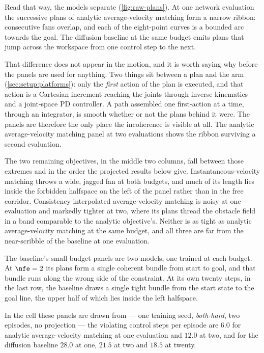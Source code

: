 Read that way, the models separate (\autoref{fig:raw-plans}). At one network evaluation the successive
plans of analytic average-velocity matching form a narrow ribbon: consecutive fans overlap, and each of
the eight-point curves is a bounded arc towards the goal. The diffusion baseline at the same budget emits
plans that jump across the workspace from one control step to the next.

That difference does not appear in the motion, and it is worth saying why before the panels are used for
anything. Two things sit between a plan and the arm (\autoref{sec:setup:platforms}): only the
\emph{first} action of the plan is executed, and that action is a Cartesian increment reaching the joints
through inverse kinematics and a joint-space PD controller. A path assembled one first-action at a time,
through an integrator, is smooth whether or not the plans behind it were. The panels are therefore the
only place the incoherence is visible at all. The analytic average-velocity matching panel at two
evaluations shows the ribbon surviving a second evaluation.

The two remaining objectives, in the middle two columns, fall between those extremes and in the order
the projected results below give. Instantaneous-velocity matching throws a wide, jagged fan at both budgets, and much of its length
lies inside the forbidden halfspace on the left of the panel rather than in the free corridor.
Consistency-interpolated average-velocity matching is noisy at one evaluation and markedly tighter at two,
where its plans thread the obstacle field in a band comparable to the analytic objective's. Neither is as
tight as analytic average-velocity matching at the same budget, and all three are far from the near-scribble
of the baseline at one evaluation.

The baseline's small-budget panels are two models, one trained at each budget. At $\nfe=2$ its plans
form a single coherent bundle from start to goal, and that bundle runs along the wrong side of the
constraint. At its own twenty steps, in the last row, the baseline draws a single tight bundle from the
start state to the goal line, the upper half of which lies inside the left halfspace.

In the cell these panels are drawn from --- one training seed, \emph{both-hard}, two episodes, no
projection --- the violating control steps per episode are $6.0$ for analytic average-velocity matching at one evaluation and $12.0$ at two, and for the
diffusion baseline $28.0$ at one, $21.5$ at two and $18.5$ at twenty.


